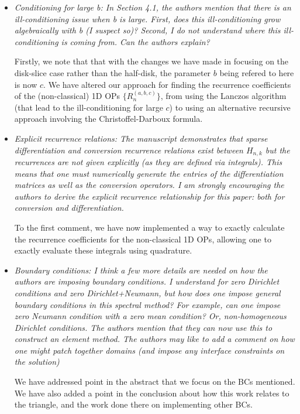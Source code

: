 \documentclass[10pt]{letter}
\newcommand{\comment}[1]{\textit{\color{bluey}#1}}
\newcommand{\genjac}{R}
\begin{document}
\begin{itemize}[parsep=1em,leftmargin=1em]

\item \comment{Conditioning for large b: In Section 4.1, the authors mention that there is an ill-conditioning issue when b is large. First, does this ill-conditioning grow algebraically with b (I suspect so)? Second, I do not understand where this ill-conditioning is coming from. Can the authors explain?}

Firstly, we note that that with the changes we have made in focusing on the disk-slice case rather than the half-disk, the parameter $b$ being refered to here is now $c$. We have altered our approach for finding the recurrence coefficients of the (non-classical) 1D OPs $\{\genjac_n^{(a,b,c)}\}$, from using the Lanczos algorithm (that lead to the ill-conditioning for large $c$) to using an alternative recursive approach involving the Christoffel-Darboux formula.


\item \comment{Explicit recurrence relations: The manuscript demonstrates that sparse differentiation and conversion recurrence relations exist between $H_{n,k}$ but the recurrences are not given explicitly (as they are defined via integrals). This means that one must numerically generate the entries of the differentiation matrices as well as the conversion operators. I am strongly encouraging the authors to derive the explicit recurrence relationship for this paper: both for conversion and differentiation.}

To the first comment, we have now implemented a way to exactly calculate the recurrence coefficients for the non-classical 1D OPs, allowing one to exactly evaluate these integrals using quadrature.


\item \comment{Boundary conditions: I think a few more details are needed on how the authors are imposing boundary conditions. I understand for zero Dirichlet conditions and zero Dirichlet+Neumann, but how does one impose general boundary conditions in this spectral method? For example, can one impose zero Neumann condition with a zero mean condition? Or, non-homogeneous Dirichlet conditions. The authors mention that they can now use this to construct an element method. The authors may like to add a comment on how one might patch together domains (and impose any interface constraints on the solution)}

We have addressed point in the abstract that we focus on the BCs mentioned. We have also added a point in the conclusion about how this work relates to the triangle, and the work done there on implementing other BCs.



\end{itemize}
\end{document}
